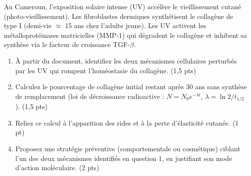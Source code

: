 \documentclass[11pt]{article}
\begin{document}
\begin{exercice}
Au Cameroun, l'exposition solaire intense (UV) accélère le vieillissement cutané (photo-vieillissement). Les fibroblastes dermiques synthétisent le collagène de type I (demi-vie $\approx$ 15 ans chez l'adulte jeune). Les UV activent les métalloprotéinases matricielles (MMP-1) qui dégradent le collagène et inhibent sa synthèse via le facteur de croissance TGF-$\beta$.

\begin{enumerate}
    \item À partir du document, identifiez les deux mécanismes cellulaires perturbés par les UV qui rompent l'homéostasie du collagène. (1,5 pts)
    \item Calculez le pourcentage de collagène initial restant après 30 ans sans synthèse de remplacement (loi de décroissance radioactive : $N = N_0 e^{-\lambda t}$, $\lambda = \ln 2 / t_{1/2}$). (1,5 pts)
    \item Reliez ce calcul à l'apparition des rides et à la perte d'élasticité cutanée. (1 pt)
    \item Proposez une stratégie préventive (comportementale ou cosmétique) ciblant l'un des deux mécanismes identifiés en question 1, en justifiant son mode d'action moléculaire. (2 pts)
\end{enumerate}
\end{exercice}
\end{document}
